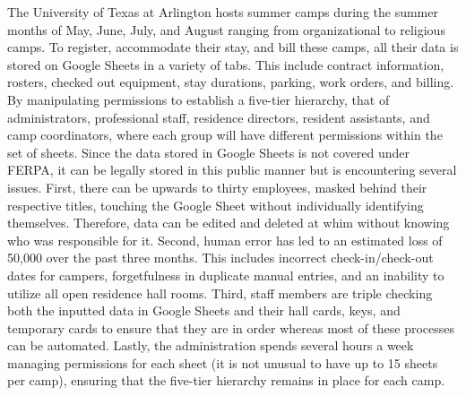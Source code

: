 The University of Texas at Arlington hosts summer camps during the summer months of May, June, July, and August ranging from organizational to religious camps. To register, accommodate their stay, and bill these camps, all their data is stored on Google Sheets in a variety of tabs. This include contract information, rosters, checked out equipment, stay durations, parking, work orders, and billing. By manipulating permissions to establish a five-tier hierarchy, that of administrators, professional staff, residence directors, resident assistants, and camp coordinators, where each group will have different permissions within the set of sheets. Since the data stored in Google Sheets is not covered under FERPA, it can be legally stored in this public manner but is encountering several issues. First, there can be upwards to thirty employees, masked behind their respective titles, touching the Google Sheet without individually identifying themselves. Therefore, data can be edited and deleted at whim without knowing who was responsible for it. Second, human error has led to an estimated loss of 50,000 over the past three months. This includes incorrect check-in/check-out dates for campers, forgetfulness in duplicate manual entries, and an inability to utilize all open residence hall rooms. Third, staff members are triple checking both the inputted data in Google Sheets and their hall cards, keys, and temporary cards to ensure that they are in order whereas most of these processes can be automated. Lastly, the administration spends several hours a week managing permissions for each sheet (it is not unusual to have up to 15 sheets per camp), ensuring that the five-tier hierarchy remains in place for each camp.
